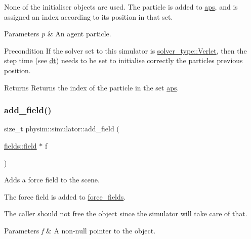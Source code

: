 None of the initialiser objects are used. The particle is added to \hyperlink{classphysim_1_1simulator_a838f036ef9d378d1e3f5207c3f031b52}{aps}, and is assigned an index according to its position in that set. 
\begin{DoxyParams}{Parameters}
{\em p} & An agent particle. \\
\hline
\end{DoxyParams}
\begin{DoxyPrecond}{Precondition}
If the solver set to this simulator is \hyperlink{namespacephysim_a09adeda29c09e651877e880d31fc9686ac1f9df543f33d8a79fb2437c853f09b9}{solver\+\_\+type\+::\+Verlet}, then the step time (see \hyperlink{classphysim_1_1simulator_a12a60d0ed819937b51ce50162dbdd6e1}{dt}) needs to be set to initialise correctly the particle\textquotesingle{}s previous position. 
\end{DoxyPrecond}
\begin{DoxyReturn}{Returns}
Returns the index of the particle in the set \hyperlink{classphysim_1_1simulator_a838f036ef9d378d1e3f5207c3f031b52}{aps}. 
\end{DoxyReturn}
\mbox{\label{classphysim_1_1simulator_afb7ded1049ec82f7ea8d908c5cefaff7}} 
\subsubsection{\texorpdfstring{add\+\_\+field()}{add\_field()}}
{\footnotesize\ttfamily size\+\_\+t physim\+::simulator\+::add\+\_\+field (\begin{DoxyParamCaption}\item[{\hyperlink{classphysim_1_1fields_1_1field}{fields\+::field} $\ast$}]{f }\end{DoxyParamCaption})}



Adds a force field to the scene. 

The force field is added to \hyperlink{classphysim_1_1simulator_a7e4d709f4b43199405be83eded074816}{force\+\_\+fields}.

The caller should not free the object since the simulator will take care of that. 
\begin{DoxyParams}{Parameters}
{\em f} & A non-\/null pointer to the object. \\
\hline
\end{DoxyParams}
\mbox{\label{classphysim_1_1simulator_a0b65d437e6e32a851251cfab5d184382}} 
